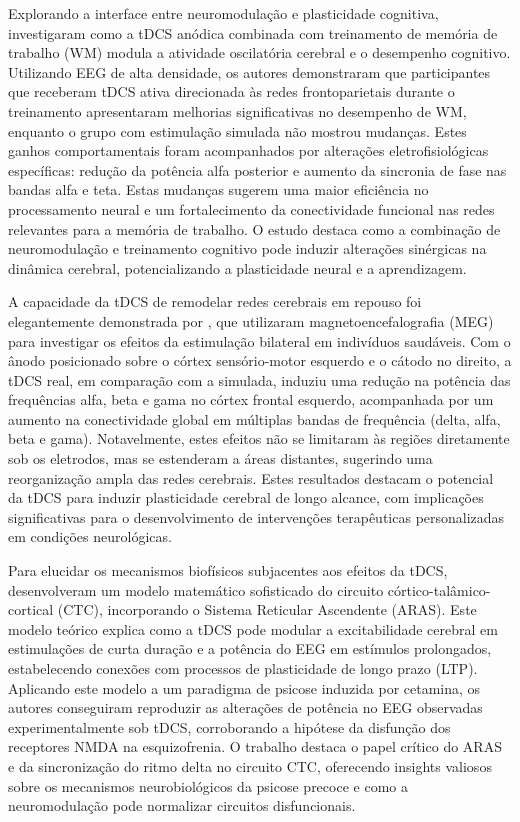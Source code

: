 Explorando a interface entre neuromodulação e plasticidade cognitiva,  investigaram como a tDCS anódica combinada com treinamento de memória de trabalho (WM) modula a atividade oscilatória cerebral e o desempenho cognitivo. Utilizando EEG de alta densidade, os autores demonstraram que participantes que receberam tDCS ativa direcionada às redes frontoparietais durante o treinamento apresentaram melhorias significativas no desempenho de WM, enquanto o grupo com estimulação simulada não mostrou mudanças. Estes ganhos comportamentais foram acompanhados por alterações eletrofisiológicas específicas: redução da potência alfa posterior e aumento da sincronia de fase nas bandas alfa e teta. Estas mudanças sugerem uma maior eficiência no processamento neural e um fortalecimento da conectividade funcional nas redes relevantes para a memória de trabalho. O estudo destaca como a combinação de neuromodulação e treinamento cognitivo pode induzir alterações sinérgicas na dinâmica cerebral, potencializando a plasticidade neural e a aprendizagem.

A capacidade da tDCS de remodelar redes cerebrais em repouso foi elegantemente demonstrada por , que utilizaram magnetoencefalografia (MEG) para investigar os efeitos da estimulação bilateral em indivíduos saudáveis. Com o ânodo posicionado sobre o córtex sensório-motor esquerdo e o cátodo no direito, a tDCS real, em comparação com a simulada, induziu uma redução na potência das frequências alfa, beta e gama no córtex frontal esquerdo, acompanhada por um aumento na conectividade global em múltiplas bandas de frequência (delta, alfa, beta e gama). Notavelmente, estes efeitos não se limitaram às regiões diretamente sob os eletrodos, mas se estenderam a áreas distantes, sugerindo uma reorganização ampla das redes cerebrais. Estes resultados destacam o potencial da tDCS para induzir plasticidade cerebral de longo alcance, com implicações significativas para o desenvolvimento de intervenções terapêuticas personalizadas em condições neurológicas.

Para elucidar os mecanismos biofísicos subjacentes aos efeitos da tDCS,  desenvolveram um modelo matemático sofisticado do circuito córtico-talâmico-cortical (CTC), incorporando o Sistema Reticular Ascendente (ARAS). Este modelo teórico explica como a tDCS pode modular a excitabilidade cerebral em estimulações de curta duração e a potência do EEG em estímulos prolongados, estabelecendo conexões com processos de plasticidade de longo prazo (LTP). Aplicando este modelo a um paradigma de psicose induzida por cetamina, os autores conseguiram reproduzir as alterações de potência no EEG observadas experimentalmente sob tDCS, corroborando a hipótese da disfunção dos receptores NMDA na esquizofrenia. O trabalho destaca o papel crítico do ARAS e da sincronização do ritmo delta no circuito CTC, oferecendo insights valiosos sobre os mecanismos neurobiológicos da psicose precoce e como a neuromodulação pode normalizar circuitos disfuncionais.

